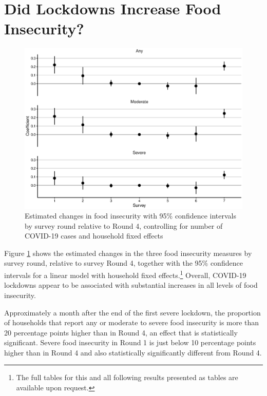 \documentclass{wber}
\begin{document}
\section{Did Lockdowns Increase Food
Insecurity?}\label{did-lockdowns-increase-food-insecurity}

\begin{figure}
\caption{Estimated changes in food insecurity with 95\% confidence
intervals by survey round relative to Round 4, controlling for number of
COVID-19 cases and household fixed
effects}\label{fig:food_insecurity_survey}
\begin{center}
\includegraphics[width=\linewidth, keepaspectratio]{./eps/fig_03.eps}
\end{center}
\end{figure}

Figure \ref{fig:food_insecurity_survey} shows the estimated changes in the
three food insecurity measures by survey round, relative to survey Round
4, together with the 95\% confidence intervals for a linear model with
household fixed effects.\footnote{The full tables for this and all
  following results presented as tables are available upon request.}
Overall, COVID-19 lockdowns appear to be associated with substantial
increases in all levels of food insecurity.

Approximately a month after the end of the first severe lockdown, the
proportion of households that report any or moderate to severe food
insecurity is more than 20 percentage points higher than in Round 4, an
effect that is statistically significant. Severe food insecurity in
Round 1 is just below 10 percentage points higher than in Round 4 and
also statistically significantly different from Round 4.
\end{document}
